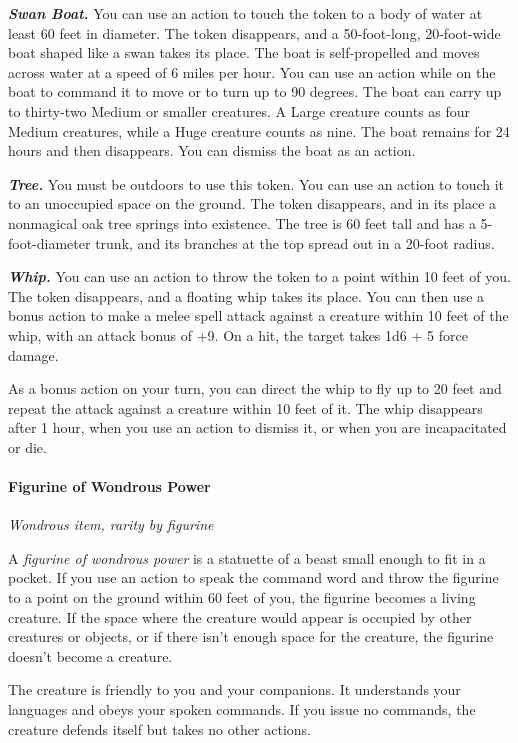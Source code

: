 \documentclass[
]{article}
\begin{document}
\emph{\textbf{Swan Boat.}} You can use an action to touch the token to a
body of water at least 60 feet in diameter. The token disappears, and a
50-foot-long, 20-foot-wide boat shaped like a swan takes its place. The
boat is self-propelled and moves across water at a speed of 6 miles per
hour. You can use an action while on the boat to command it to move or
to turn up to 90 degrees. The boat can carry up to thirty-two Medium or
smaller creatures. A Large creature counts as four Medium creatures,
while a Huge creature counts as nine. The boat remains for 24 hours and
then disappears. You can dismiss the boat as an action.

\emph{\textbf{Tree.}} You must be outdoors to use this token. You can
use an action to touch it to an unoccupied space on the ground. The
token disappears, and in its place a nonmagical oak tree springs into
existence. The tree is 60 feet tall and has a 5-foot-diameter trunk, and
its branches at the top spread out in a 20-foot radius.

\emph{\textbf{Whip.}} You can use an action to throw the token to a
point within 10 feet of you. The token disappears, and a floating whip
takes its place. You can then use a bonus action to make a melee spell
attack against a creature within 10 feet of the whip, with an attack
bonus of +9. On a hit, the target takes 1d6 + 5 force damage.

As a bonus action on your turn, you can direct the whip to fly up to 20
feet and repeat the attack against a creature within 10 feet of it. The
whip disappears after 1 hour, when you use an action to dismiss it, or
when you are incapacitated or die.

\hypertarget{figurine-of-wondrous-power}{%
\paragraph{Figurine of Wondrous
Power}\label{figurine-of-wondrous-power}}

\emph{Wondrous item, rarity by figurine}

A \emph{figurine of wondrous power} is a statuette of a beast small
enough to fit in a pocket. If you use an action to speak the command
word and throw the figurine to a point on the ground within 60 feet of
you, the figurine becomes a living creature. If the space where the
creature would appear is occupied by other creatures or objects, or if
there isn't enough space for the creature, the figurine doesn't become a
creature.

The creature is friendly to you and your companions. It understands your
languages and obeys your spoken commands. If you issue no commands, the
creature defends itself but takes no other actions.
\end{document}
